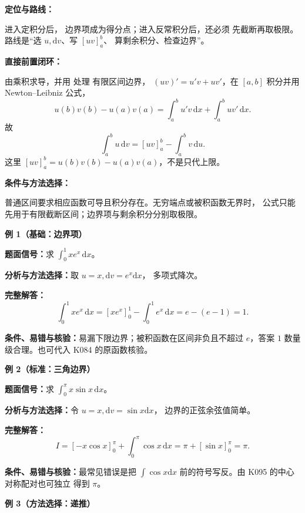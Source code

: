 
\par

\begin{knowledgeBox}
\textbf{定位与路线：}

进入定积分后，
边界项成为得分点；进入反常积分后，还必须
先截断再取极限。路线是“选 \(u,\mathrm dv\)、写 \([uv]_a^b\)、
算剩余积分、检查边界”。

\textbf{直接前置闭环：}

由乘积求导，并用
处理
有限区间边界，
\((uv)'=u'v+uv'\)，在 \([a,b]\) 积分并用 Newton--Leibniz 公式，
\[
u(b)v(b)-u(a)v(a)
=\int_a^b u'v\,\mathrm dx+\int_a^b uv'\,\mathrm dx.
\]
故
\[
\boxed{\int_a^b u\,\mathrm dv=[uv]_a^b-\int_a^b v\,\mathrm du.}
\]
这里 \([uv]_a^b=u(b)v(b)-u(a)v(a)\)，不是只代上限。

\textbf{条件与方法选择：}

普通区间要求相应函数可导且积分存在。无穷端点或被积函数无界时，
公式只能先用于有限截断区间；边界项与剩余积分分别取极限。

\textbf{例 1（基础：边界项）}

\textbf{题面信号：}求 \(\int_0^1 xe^x\,\mathrm dx\)。

\textbf{分析与方法选择：}取 \(u=x,\mathrm dv=e^x\mathrm dx\)，
多项式降次。

\textbf{完整解答：}
\[
\int_0^1xe^x\,\mathrm dx
=[xe^x]_0^1-\int_0^1e^x\,\mathrm dx
=e-(e-1)=1.
\]

\textbf{条件、易错与核验：}易漏下限边界；被积函数在区间非负且不超过
\(e\)，答案 \(1\) 数量级合理。也可代入 K084 的原函数核验。

\textbf{例 2（标准：三角边界）}

\textbf{题面信号：}求 \(\int_0^\pi x\sin x\,\mathrm dx\)。

\textbf{分析与方法选择：}令 \(u=x,\mathrm dv=\sin x\mathrm dx\)，
边界的正弦余弦值简单。

\textbf{完整解答：}
\[
I=[-x\cos x]_0^\pi+\int_0^\pi\cos x\,\mathrm dx
=\pi+[\sin x]_0^\pi=\pi.
\]

\textbf{条件、易错与核验：}最常见错误是把
\(\int\cos x\mathrm dx\) 前的符号写反。由 K095 的中心对称配对也可独立
得到 \(\pi\)。

\textbf{例 3（方法选择：递推）}


\end{knowledgeBox}
